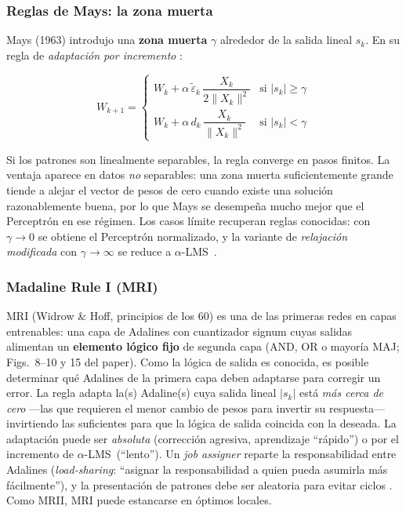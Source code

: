 \documentclass[11pt,a4paper]{article}
\newcommand{\norm}[1]{\lVert#1\rVert}
\newcommand{\aLMS}{$\alpha$-LMS}
\begin{document}
\subsubsection{Reglas de Mays: la zona muerta}

Mays (1963) introdujo una \textbf{zona muerta} $\gamma$ alrededor de la salida lineal $s_k$. En su
regla de \textit{adaptación por incremento} \cite{widrow1990}:

\begin{equation}
W_{k+1} =
\begin{cases}
W_k + \alpha\,\tilde{\varepsilon}_k\,\dfrac{X_k}{2\norm{X_k}^2} & \text{si } |s_k| \geq \gamma \\[8pt]
W_k + \alpha\,d_k\,\dfrac{X_k}{\norm{X_k}^2} & \text{si } |s_k| < \gamma
\end{cases}
\label{eq:mays}
\end{equation}

Si los patrones son linealmente separables, la regla converge en pasos finitos. La ventaja aparece
en datos \emph{no} separables: una zona muerta suficientemente grande tiende a alejar el vector de
pesos de cero cuando existe una solución razonablemente buena, por lo que Mays se desempeña mucho
mejor que el Perceptrón en ese régimen. Los casos límite recuperan reglas conocidas: con
$\gamma \to 0$ se obtiene el Perceptrón normalizado, y la variante de \textit{relajación
modificada} con $\gamma \to \infty$ se reduce a \aLMS~\cite{widrow1990}.

\subsubsection{Madaline Rule I (MRI)}

MRI (Widrow \& Hoff, principios de los 60) es una de las primeras redes en capas entrenables:
una capa de Adalines con cuantizador signum cuyas salidas alimentan un \textbf{elemento lógico fijo}
de segunda capa (AND, OR o mayoría MAJ; Figs.~8--10 y 15 del paper). Como la lógica de salida es
conocida, es posible determinar qué Adalines de la primera capa deben adaptarse para corregir un
error. La regla adapta la(s) Adaline(s) cuya salida lineal $|s_k|$ está \emph{más cerca de cero}
—las que requieren el menor cambio de pesos para invertir su respuesta— invirtiendo las suficientes
para que la lógica de salida coincida con la deseada. La adaptación puede ser \emph{absoluta}
(corrección agresiva, aprendizaje ``rápido'') o por el incremento de \aLMS~(``lento''). Un
\textit{job assigner} reparte la responsabilidad entre Adalines (\textit{load-sharing}: ``asignar
la responsabilidad a quien pueda asumirla más fácilmente''), y la presentación de patrones debe ser
aleatoria para evitar ciclos \cite{widrow1990}. Como MRII, MRI puede estancarse en óptimos locales.
\end{document}
